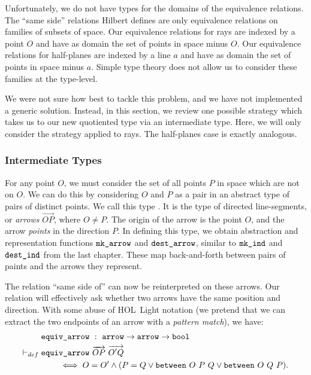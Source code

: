 Unfortunately, we do not have types for the domains of the equivalence relations. The ``same side'' relations Hilbert defines are only equivalence relations on families of subsets of space. Our equivalence relations for rays are indexed by a point $O$ and have as domain the set of points in space minus $O$. Our equivalence relations for half-planes are indexed by a line $a$ and have as domain the set of points in space minus $a$. Simple type theory does not allow us to consider these families at the type-level.

We were not sure how best to tackle this problem, and we have not implemented a generic solution. Instead, in this section, we review one possible strategy which takes us to our new quotiented type via an intermediate type. Here, we will only consider the strategy applied to rays. The half-planes case is exactly analogous.

\subsubsection{Intermediate Types}
For any point $O$, we must consider the set of all points $P$ in space which are not on $O$. We can do this by considering $O$ and $P$ as a pair in an abstract type of pairs of distinct points. We call this type . It is the type of directed line-segments, or \emph{arrows} $\overrightarrow{OP}$, where $O \neq P$. The origin of the arrow is the point $O$, and the arrow \emph{points} in the direction $P$. In defining this type, we obtain abstraction and representation functions $\texttt{mk\_arrow}$ and $\texttt{dest\_arrow}$, similar to $\texttt{mk\_ind}$ and $\texttt{dest\_ind}$ from the last chapter. These map back-and-forth between pairs of paints and the arrows they represent.

The relation ``same side of'' can now be reinterpreted on these arrows. Our relation will effectively ask whether two arrows have the same position and direction. With some abuse of HOL~Light notation (we pretend that we can extract the two endpoints of an arrow with a \emph{pattern match}), we have:
\begin{equation}\label{eq:EquivArrowDef}
  \begin{split}
    &\code{equiv\_arrow}\ :\ \code{arrow} \rightarrow \code{arrow}\rightarrow \code{bool}\\
    \vdash_{def}\; &\code{equiv\_arrow}\ \overrightarrow{OP}\ \overrightarrow{O'Q}\\
    &\qquad\iff O = O' \wedge (P = Q \vee \between{O}{P}{Q} \vee \between{O}{Q}{P}).
  \end{split}
\end{equation}


